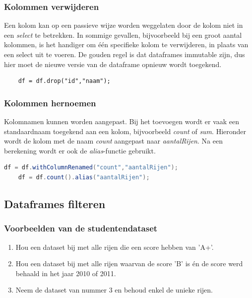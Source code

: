 \documentclass[a4paper,10pt,twoside]{report}
\begin{document}
\subsubsection{Kolommen verwijderen}

Een kolom kan op een passieve wijze worden weggelaten door de kolom niet in een \textit{select} te betrekken. In sommige gevallen, bijvoorbeeld bij een groot aantal kolommen, is het handiger om één specifieke kolom te verwijderen, in plaats van een select uit te voeren. De gouden regel is dat dataframes immutable zijn, dus hier moet de nieuwe versie van de dataframe opnieuw wordt toegekend.

\begin{lstlisting}
	df = df.drop("id","naam");
\end{lstlisting}

\subsubsection{Kolommen hernoemen}

Kolomnamen kunnen worden aangepast. Bij het toevoegen wordt er vaak een standaardnaam toegekend aan een kolom, bijvoorbeeld \textit{count} of \textit{sum}. Hieronder wordt de kolom met de naam \textit{count} aangepast naar \textit{aantalRijen}. Na een berekening wordt er ook de \textit{alias}-functie gebruikt. 

\begin{lstlisting}[language=Java]
	df = df.withColumnRenamed("count","aantalRijen");
	df = df.count().alias("aantalRijen");
\end{lstlisting}

\subsection{Dataframes filteren}

\subsubsection{Voorbeelden van de studentendataset}

\begin{enumerate}
	\item Hou een dataset bij met alle rijen die een score hebben van 'A+'.
	\item Hou een dataset bij met alle rijen waarvan de score 'B' is én de score werd behaald in het jaar 2010 of 2011.
	\item Neem de dataset van nummer 3 en behoud enkel de unieke rijen.
\end{enumerate}
\end{document}
